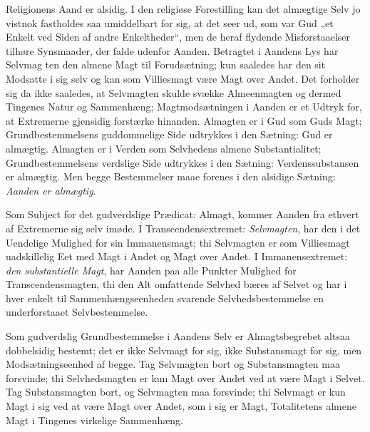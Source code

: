\documentclass[12pt]{book}
\begin{document}
Religionens Aand er alsidig. I den religiøse Forestilling kan det
almægtige Selv jo vistnok fastholdes saa umiddelbart for sig, at det
seer ud, som var Gud „et Enkelt ved Siden af andre Enkeltheder“, men
de heraf flydende Misforstaaelser tilhøre Synsmaader, der falde
udenfor Aanden. Betragtet i Aandens Lys har Selvmag\-
ten den almene Magt til Forudsætning; kun saaledes har den sit
Modsatte i sig selv og kan som Villiesmagt være Magt over Andet. Det
forholder sig da ikke saaledes, at Selvmagten skulde svække
Almeenmagten og dermed Tingenes Natur og Sammenhæng;
Magtmodsætningen i Aanden er et Udtryk for, at Extremerne gjensidig
forstærke hinanden. Almagten er i Gud som Guds Magt;
Grundbestemmelsens guddommelige Side udtrykkes i den Sætning: Gud er
almægtig. Almagten er i Verden som Selvhedens almene
Substantialitet; Grundbestemmelsens verdslige Side udtrykkes i den
Sætning: Verdenssubstansen er almægtig. Men begge Bestemmelser maae
forenes i den alsidige Sætning: \emph{Aanden er almægtig}.

Som Subject for det gudverdslige Prædicat: Almagt, kommer Aanden fra
ethvert af Extremerne sig selv imøde. I Transcendensextremet:
\emph{Selvmagten}, har den i det Uendelige Mulighed for sin
Immanensmagt; thi Selvmagten er som Villiesmagt uadskillelig Eet med
Magt i Andet og Magt over Andet. I Immanensextremet: \emph{den
substantielle Magt}, har Aanden paa alle Punkter Mulighed for
Transcendensmagten, thi den Alt omfattende Selvhed bæres af Selvet
og har i hver enkelt til Sammenhængseenheden svarende
Selvhedsbestemmelse en underforstaaet Selvbestemmelse.

Som gudverdslig Grundbestemmelse i Aandens Selv er Almagtsbegrebet
altsaa dobbelsidig bestemt; det er ikke Selvmagt for sig, ikke
Substansmagt for sig, men Modsætningseenhed af begge. Tag Selvmagten
bort og Substansmagten maa forsvinde; thi Selvhedsmagten er kun Magt
over Andet ved at være Magt i Selvet. Tag Substansmagten bort, og
Selvmagten maa forsvinde; thi Selvmagt er kun Magt i sig ved at være
Magt over Andet, som i sig er Magt, Totalitetens almene Magt i
Tingenes virkelige Sammenhæng.
\end{document}
